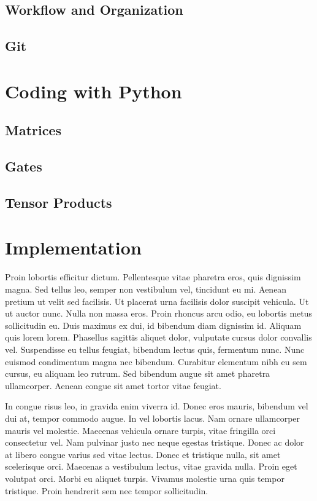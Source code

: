 \documentclass{article}
\begin{document}
\subsection{Workflow and Organization}

\subsection{Git}

\section{Coding with Python}


\subsection{Matrices}
\subsection{Gates}
\subsection{Tensor Products}

\section{Implementation}

Proin lobortis efficitur dictum. Pellentesque vitae pharetra eros, quis dignissim magna. Sed tellus leo, semper non vestibulum vel, tincidunt eu mi. Aenean pretium ut velit sed facilisis. Ut placerat urna facilisis dolor suscipit vehicula. Ut ut auctor nunc. Nulla non massa eros. Proin rhoncus arcu odio, eu lobortis metus sollicitudin eu. Duis maximus ex dui, id bibendum diam dignissim id. Aliquam quis lorem lorem. Phasellus sagittis aliquet dolor, vulputate cursus dolor convallis vel. Suspendisse eu tellus feugiat, bibendum lectus quis, fermentum nunc. Nunc euismod condimentum magna nec bibendum. Curabitur elementum nibh eu sem cursus, eu aliquam leo rutrum. Sed bibendum augue sit amet pharetra ullamcorper. Aenean congue sit amet tortor vitae feugiat.

In congue risus leo, in gravida enim viverra id. Donec eros mauris, bibendum vel dui at, tempor commodo augue. In vel lobortis lacus. Nam ornare ullamcorper mauris vel molestie. Maecenas vehicula ornare turpis, vitae fringilla orci consectetur vel. Nam pulvinar justo nec neque egestas tristique. Donec ac dolor at libero congue varius sed vitae lectus. Donec et tristique nulla, sit amet scelerisque orci. Maecenas a vestibulum lectus, vitae gravida nulla. Proin eget volutpat orci. Morbi eu aliquet turpis. Vivamus molestie urna quis tempor tristique. Proin hendrerit sem nec tempor sollicitudin.
\end{document}

